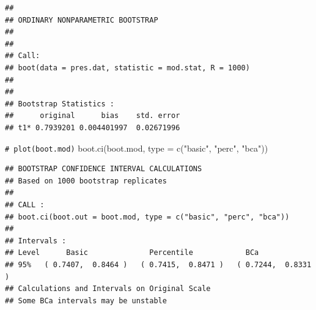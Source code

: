 \documentclass[
]{book}
\newenvironment{Shaded}{\begin{snugshade}}{\end{snugshade}}
\newcommand{\AttributeTok}[1]{\textcolor[rgb]{0.77,0.63,0.00}{#1}}
\newcommand{\CommentTok}[1]{\textcolor[rgb]{0.56,0.35,0.01}{\textit{#1}}}
\newcommand{\ControlFlowTok}[1]{\textcolor[rgb]{0.13,0.29,0.53}{\textbf{#1}}}
\newcommand{\DecValTok}[1]{\textcolor[rgb]{0.00,0.00,0.81}{#1}}
\newcommand{\FunctionTok}[1]{\textcolor[rgb]{0.00,0.00,0.00}{#1}}
\newcommand{\NormalTok}[1]{#1}
\newcommand{\OtherTok}[1]{\textcolor[rgb]{0.56,0.35,0.01}{#1}}
\newcommand{\SpecialCharTok}[1]{\textcolor[rgb]{0.00,0.00,0.00}{#1}}
\newcommand{\StringTok}[1]{\textcolor[rgb]{0.31,0.60,0.02}{#1}}
\theoremstyle{break}
\theoremstyle{nonumberplain}
\renewcommand{\CommentTok}[1]{\textcolor[rgb]{0.41,0.41,0.41}{\texttt{#1}}}
\begin{document}
\begin{Shaded}
\end{Shaded}

\begin{verbatim}
## 
## ORDINARY NONPARAMETRIC BOOTSTRAP
## 
## 
## Call:
## boot(data = pres.dat, statistic = mod.stat, R = 1000)
## 
## 
## Bootstrap Statistics :
##      original      bias    std. error
## t1* 0.7939201 0.004401997  0.02671996
\end{verbatim}

\begin{Shaded}
\begin{Highlighting}[]
\CommentTok{\# plot(boot.mod)}
\FunctionTok{boot.ci}\NormalTok{(boot.mod, }\AttributeTok{type =} \FunctionTok{c}\NormalTok{(}\StringTok{"basic"}\NormalTok{, }\StringTok{"perc"}\NormalTok{, }\StringTok{"bca"}\NormalTok{))}
\end{Highlighting}
\end{Shaded}

\begin{verbatim}
## BOOTSTRAP CONFIDENCE INTERVAL CALCULATIONS
## Based on 1000 bootstrap replicates
## 
## CALL : 
## boot.ci(boot.out = boot.mod, type = c("basic", "perc", "bca"))
## 
## Intervals : 
## Level      Basic              Percentile            BCa          
## 95%   ( 0.7407,  0.8464 )   ( 0.7415,  0.8471 )   ( 0.7244,  0.8331 )  
## Calculations and Intervals on Original Scale
## Some BCa intervals may be unstable
\end{verbatim}
\end{document}

